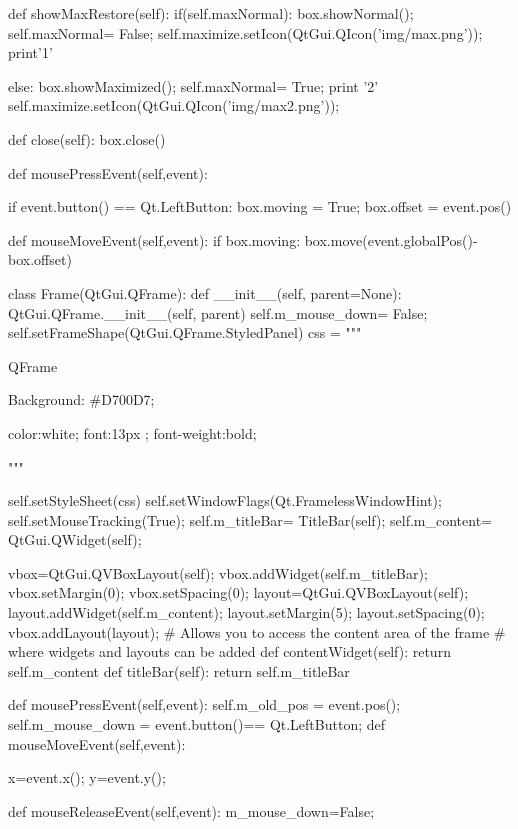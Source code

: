 \begin{python}
    def showMaxRestore(self):
        if(self.maxNormal):
            box.showNormal();
            self.maxNormal= False;
            self.maximize.setIcon(QtGui.QIcon('img/max.png'));
            print'1'

        else:
            box.showMaximized();
            self.maxNormal=  True;
            print '2'
            self.maximize.setIcon(QtGui.QIcon('img/max2.png'));

    def close(self):
        box.close()

    def mousePressEvent(self,event):

        if event.button() == Qt.LeftButton:
            box.moving = True; box.offset = event.pos()

    def mouseMoveEvent(self,event):
        if box.moving: box.move(event.globalPos()-box.offset)


class Frame(QtGui.QFrame):
    def __init__(self, parent=None):
        QtGui.QFrame.__init__(self, parent)
        self.m_mouse_down= False;
        self.setFrameShape(QtGui.QFrame.StyledPanel)
        css = """

QFrame

{
Background:  #D700D7;


color:white;
font:13px ;
font-weight:bold;

}


"""


        self.setStyleSheet(css) 
        self.setWindowFlags(Qt.FramelessWindowHint);
        self.setMouseTracking(True);
        self.m_titleBar= TitleBar(self);
        self.m_content= QtGui.QWidget(self);

        vbox=QtGui.QVBoxLayout(self);
        vbox.addWidget(self.m_titleBar);
        vbox.setMargin(0);
        vbox.setSpacing(0);
        layout=QtGui.QVBoxLayout(self);
        layout.addWidget(self.m_content);
        layout.setMargin(5);
        layout.setSpacing(0);
        vbox.addLayout(layout);
        # Allows you to access the content area of the frame
        # where widgets and layouts can be added
    def contentWidget(self):
        return self.m_content
    def titleBar(self):
        return self.m_titleBar

    def mousePressEvent(self,event):
        self.m_old_pos = event.pos();
        self.m_mouse_down = event.button()== Qt.LeftButton;
    def mouseMoveEvent(self,event):

        x=event.x();
        y=event.y();

    def mouseReleaseEvent(self,event):
        m_mouse_down=False;





\end{python}
